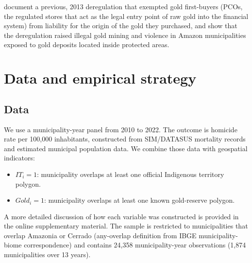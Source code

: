 \documentclass[preprint,12pt]{elsarticle}
\begin{document}
 \citet{pereira_pucci_2024} document a previous, 2013 deregulation that exempted gold first-buyers (PCOs, the regulated stores that act as the legal entry point of raw gold into the financial system) from liability for the origin of the gold they purchased, and show that the deregulation raised illegal gold mining and violence in Amazon municipalities exposed to gold deposits located inside protected areas.

\section{Data and empirical strategy}\label{sec:strategy}
\subsection{Data}
We use a municipality-year panel from 2010 to 2022. The outcome is homicide rate per 100,000 inhabitants, constructed from SIM/DATASUS mortality records and estimated municipal population data. We combine those data with geospatial indicators:
\begin{itemize}
\item \(IT_i=1\): municipality overlaps at least one official Indigenous territory polygon.
\item \(Gold_i=1\): municipality overlaps at least one known gold-reserve polygon.
\end{itemize}

A more detailed discussion of how each variable was constructed is provided in the online supplementary material. The sample is restricted to municipalities that overlap Amazonia or Cerrado (any-overlap definition from IBGE municipality-biome correspondence) and contains 24,358 municipality-year observations (1,874 municipalities over 13 years).
\end{document}
